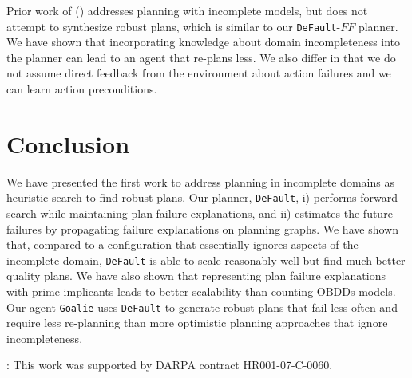 \documentclass[letterpaper]{article}
\def\und#1{\noindent{\bf #1}:}
\def\default{{\tt DeFault}}
\def\goalie{{\tt Goalie}}
\def\citet#1{\citeauthor{#1} (\citeyear{#1})}
\begin{document}
Prior work of \citet{DBLP:conf/aips/ChangA06} addresses planning with incomplete
models, but does not attempt to synthesize robust plans, which is similar to our
\default{}-$FF$ planner.  We have shown that incorporating knowledge about
domain incompleteness into the planner can lead to an agent that re-plans less. 
We also differ in that we do not assume direct feedback from the environment about
action failures and we can learn action preconditions.

\section{Conclusion}

We have presented the first work to address planning in incomplete domains as
heuristic search to find robust plans.  Our planner, \default{}, i) performs
forward search while maintaining plan failure explanations, and ii) estimates
the future failures by propagating failure explanations on planning graphs.  We
have shown that, compared to a configuration that essentially ignores aspects of
the incomplete domain, \default{} is able to scale reasonably well but find much
better quality plans.  We have also shown that representing plan failure
explanations with prime implicants leads to better scalability than counting
OBDDs models.  Our agent \goalie{} uses \default{} to generate robust plans that
fail less often and require less re-planning than more optimistic planning
approaches that ignore  incompleteness.


\und{Acknowledgements} This work was supported by DARPA contract HR001-07-C-0060.



 
\end{document}

